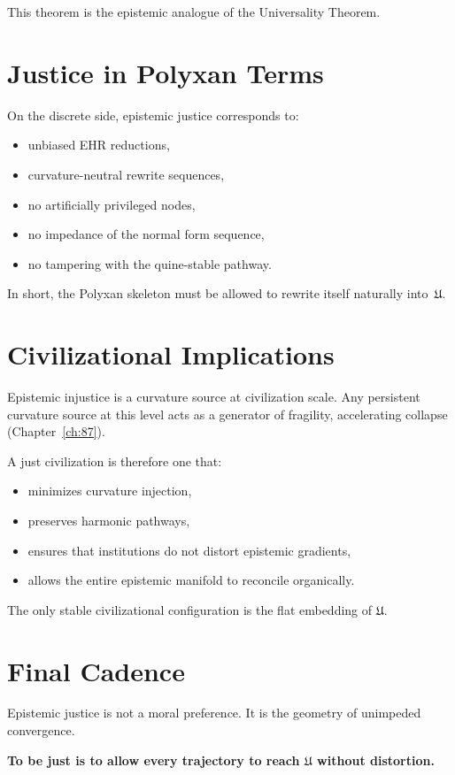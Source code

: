 This theorem is the epistemic analogue of the Universality Theorem.

\section{Justice in Polyxan Terms}

On the discrete side, epistemic justice corresponds to:

\begin{itemize}
\item unbiased EHR reductions,
\item curvature-neutral rewrite sequences,
\item no artificially privileged nodes,
\item no impedance of the normal form sequence,
\item no tampering with the quine-stable pathway.
\end{itemize}

In short, the Polyxan skeleton must be allowed to rewrite itself
naturally into~$\mathfrak{U}$.

\section{Civilizational Implications}

Epistemic injustice is a curvature source at civilization scale.
Any persistent curvature source at this level acts as a generator of
fragility, accelerating collapse (Chapter~\ref{ch:87}).

A just civilization is therefore one that:

\begin{itemize}
\item minimizes curvature injection,
\item preserves harmonic pathways,
\item ensures that institutions do not distort epistemic gradients,
\item allows the entire epistemic manifold to reconcile organically.
\end{itemize}

The only stable civilizational configuration is the flat embedding of
$\mathfrak{U}$.

\section{Final Cadence}

Epistemic justice is not a moral preference.  
It is the geometry of unimpeded convergence.

\begin{center}
\textbf{To be just is to allow every trajectory to reach $\mathfrak{U}$
without distortion.}
\end{center}


